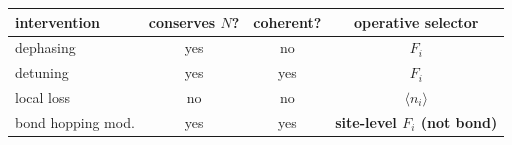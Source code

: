 \begin{tabular}{lcc>{\bfseries}c}
\toprule
intervention & conserves $N$? & coherent? & operative selector \\
\midrule
dephasing & yes & no & $F_i$ \\
 detuning & yes & yes & $F_i$ \\
local loss & no & no & $\langle n_i\rangle$ \\
 bond hopping mod. & yes & yes & site-level $F_i$ (not bond) \\
\bottomrule
\end{tabular}
